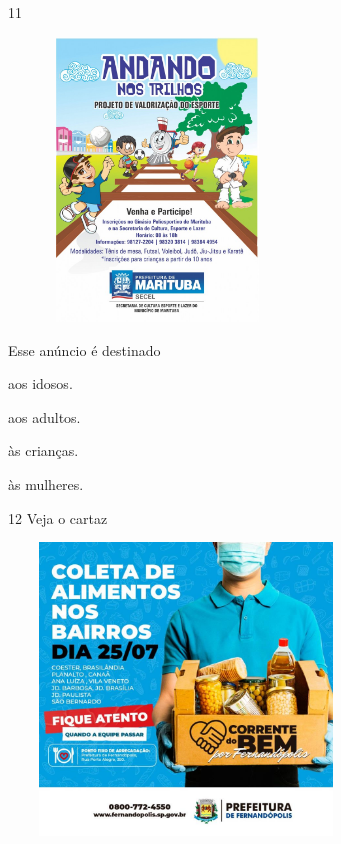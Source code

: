 \num{11}

\includegraphics[width=3.11515in,height=2.97237in]{media/image170.jpeg}


Esse anúncio é destinado

\begin{escolha}
\item aos idosos.

\item aos adultos.

\item às crianças.

\item às mulheres.
\end{escolha}


\num{12} Veja o cartaz

\includegraphics[width=3.71207in,height=3.06667in]{media/image171.jpeg}


